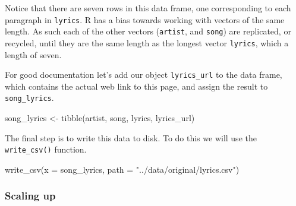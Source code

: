 \documentclass[
]{article}
\newenvironment{Shaded}{\begin{snugshade}}{\end{snugshade}}
\newcommand{\AttributeTok}[1]{\textcolor[rgb]{0.77,0.63,0.00}{#1}}
\newcommand{\CommentTok}[1]{\textcolor[rgb]{0.56,0.35,0.01}{\textit{#1}}}
\newcommand{\FunctionTok}[1]{\textcolor[rgb]{0.00,0.00,0.00}{#1}}
\newcommand{\NormalTok}[1]{#1}
\newcommand{\OtherTok}[1]{\textcolor[rgb]{0.56,0.35,0.01}{#1}}
\newcommand{\SpecialCharTok}[1]{\textcolor[rgb]{0.00,0.00,0.00}{#1}}
\newcommand{\StringTok}[1]{\textcolor[rgb]{0.31,0.60,0.02}{#1}}
\begin{document}
\begin{Shaded}
\end{Shaded}

Notice that there are seven rows in this data frame, one corresponding to each paragraph in \texttt{lyrics}. R has a bias towards working with vectors of the same length. As such each of the other vectors (\texttt{artist}, and \texttt{song}) are replicated, or recycled, until they are the same length as the longest vector \texttt{lyrics}, which a length of seven.

For good documentation let's add our object \texttt{lyrics\_url} to the data frame, which contains the actual web link to this page, and assign the result to \texttt{song\_lyrics}.

\begin{Shaded}
\begin{Highlighting}[]
\NormalTok{song\_lyrics }\OtherTok{\textless{}{-}} \FunctionTok{tibble}\NormalTok{(artist, song, lyrics, lyrics\_url)}
\end{Highlighting}
\end{Shaded}

The final step is to write this data to disk. To do this we will use the \texttt{write\_csv()} function.

\begin{Shaded}
\begin{Highlighting}[]
\FunctionTok{write\_csv}\NormalTok{(}\AttributeTok{x =}\NormalTok{ song\_lyrics, }\AttributeTok{path =} \StringTok{"../data/original/lyrics.csv"}\NormalTok{)}
\end{Highlighting}
\end{Shaded}

\hypertarget{scaling-up}{%
\subsubsection{Scaling up}\label{scaling-up}}
\end{document}
